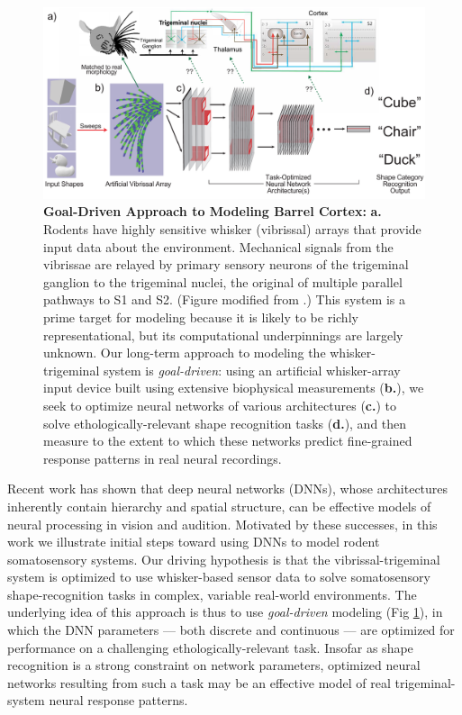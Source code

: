 \begin{figure}
\FigCenter
\includegraphics[width=\SchFigSize\linewidth]{figures/schematic.pdf}
\vspace{-3mm}
\caption{\footnotesize{\textbf{Goal-Driven Approach to Modeling Barrel Cortex:} \textbf{a.} Rodents have highly sensitive whisker (vibrissal) arrays that provide input data about the environment. Mechanical signals from the vibrissae are relayed by primary sensory neurons of the trigeminal ganglion to the trigeminal nuclei, the original of multiple parallel pathways to S1 and S2. (Figure modified from \cite{deschenes2009vibrissal}.) This system is a prime target for modeling because it is likely to be richly representational, but its computational underpinnings are largely unknown. Our long-term approach to modeling the whisker-trigeminal system is \emph{goal-driven}: using an artificial whisker-array input device built using extensive biophysical measurements (\textbf{b.}), we seek to optimize neural networks of various architectures (\textbf{c.}) to solve ethologically-relevant shape recognition tasks (\textbf{d.}), and then measure to the extent to which these networks predict fine-grained response patterns in real neural recordings.} ~\label{fig_schematic}}
\vspace{-5mm}
\end{figure}

Recent work has shown that deep neural networks (DNNs), whose architectures inherently contain hierarchy and spatial structure, can be effective models of neural processing in vision\cite{Yamins2014,khaligh2014deep} and audition\cite{kell_yamins_sfn}.
Motivated by these successes, in this work we illustrate initial steps toward using DNNs to model rodent somatosensory systems.
Our driving hypothesis is that the vibrissal-trigeminal system is optimized to use whisker-based sensor data to solve somatosensory shape-recognition tasks in complex, variable real-world environments.
The underlying idea of this approach is thus to use \emph{goal-driven} modeling (Fig \ref{fig_schematic}), in which the DNN parameters --- both discrete and continuous --- are optimized for performance on a challenging ethologically-relevant task\cite{yamins2016using}.
Insofar as shape recognition is a strong constraint on network parameters, optimized neural networks resulting from such a task may be an effective model of real trigeminal-system neural response patterns.

